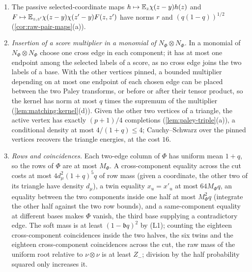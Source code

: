\begin{enumerate}[label=(L\arabic*)]
 Summing the table and the six means gives $\mathfrak b$.
 In particular
 \[
 \mathfrak b\le6+\frac{102}{1-q}
                     +\frac{32+112r}{1-q^2}<140.004
                     \qquad(p\ge2^{30}),
 \]
 with limit $140$. All these majorants are increasing in $q,r$.
\item The passive selected-coordinate maps $h\mapsto\mathbb E_z\chi(z-y)h(z)$ and
 $F\mapsto\mathbb E_{z,z'}\chi(z-y)\chi(z'-y)F(z,z')$ have norms $r$ and $(q(1-q))^{1/2}$
 (\cref{cor:raw-pair-maps}(a)).
\item \emph{Insertion of a score multiplier in a monomial of $N_\Phi\otimes N_\Phi$.}
In a monomial of $N_\Phi\otimes N_\Phi$ choose one cross
 edge in each component; it has at most one endpoint among the selected labels of a score,
 as no cross edge joins the two labels of a base. With the other vertices pinned, a bounded
 multiplier depending on at most one endpoint of each chosen edge can be placed between
 the two Paley transforms, or before or after their tensor product, so the kernel has norm
 at most $q$ times the supremum of the multiplier (\cref{lem:matching:kernel}(d)). Given the
 other two vertices of a triangle, the active vertex has exactly $(p+1)/4$ completions
 (\cref{lem:paley-triple}(a)), a conditional density at most $4/(1+q)\le4$; Cauchy--Schwarz
 over the pinned vertices recovers the triangle energies, at the cost $16$.
\item \emph{Rows and coincidences.} Each two-edge column of $\Phi$ has uniform mean $1+q$, so
 the rows of $\Phi$ are at most $M_\Phi$. A cross-component equality across the cut costs at
 most $4d_\mu^2(1+q)^5q$ of row mass (given a coordinate, the other two of its triangle have
 density $d_\mu$), a twin equality $x_u=x'_u$ at most $64M_\Phi q$, an equality between
 the two components inside one half at most $M_\Phi^2q$ (integrate the other half against
 the two row bounds), and a same-component equality at different bases makes $\Phi$ vanish,
 the third base supplying a contradictory edge. The soft mass is at least
 $(1-\mathfrak bq)^2$ by (L1); counting the eighteen cross-component coincidences inside the
 two halves, the six twins and the eighteen cross-component coincidences across the cut,
 the raw mass of the uniform root relative to $\nu\otimes\nu$ is at least $Z_-$; division by
 the half probability squared only increases it.
\end{enumerate}

